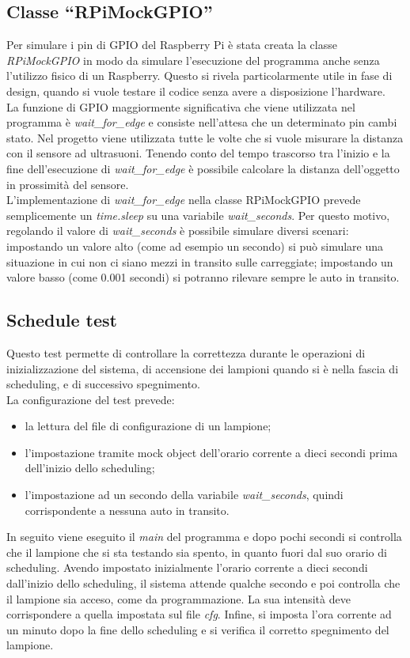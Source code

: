 \subsection{Classe ``RPiMockGPIO''}
Per simulare i pin di GPIO del Raspberry Pi è stata creata la classe \textit{RPiMockGPIO} in modo da simulare l'esecuzione del programma anche senza l'utilizzo fisico di un Raspberry.
Questo si rivela particolarmente utile in fase di design, quando si vuole testare il codice senza avere a disposizione l'hardware.
\\La funzione di GPIO maggiormente significativa che viene utilizzata nel programma è \textit{wait\_for\_edge} e consiste nell'attesa che un determinato pin cambi stato.
Nel progetto viene utilizzata tutte le volte che si vuole misurare la distanza con il sensore ad ultrasuoni.
Tenendo conto del tempo trascorso tra l'inizio e la fine dell'esecuzione di \textit{wait\_for\_edge} è possibile calcolare la distanza dell'oggetto in prossimità del sensore.
\\L'implementazione di \textit{wait\_for\_edge} nella classe RPiMockGPIO prevede semplicemente un \textit{time.sleep} su una variabile \textit{wait\_seconds}.
Per questo motivo, regolando il valore di \textit{wait\_seconds} è possibile simulare diversi scenari: impostando un valore alto (come ad esempio un secondo) si può simulare una situazione in cui non ci siano mezzi in transito sulle carreggiate;
impostando un valore basso (come 0.001 secondi) si potranno rilevare sempre le auto in transito.

\subsection{Schedule test \label{st}}
Questo test permette di controllare la correttezza durante le operazioni di inizializzazione del sistema, di accensione dei lampioni quando si è nella fascia di scheduling, e di successivo spegnimento.
\\La configurazione del test prevede:
\begin{itemize}
	\item la lettura del file di configurazione di un lampione;
	\item l'impostazione tramite mock object dell'orario corrente a dieci secondi prima dell'inizio dello scheduling;
	\item l'impostazione ad un secondo della variabile \textit{wait\_seconds}, quindi corrispondente a nessuna auto in transito.
\end{itemize}
In seguito viene eseguito il \textit{main} del programma e dopo pochi secondi si controlla che il lampione che si sta testando sia spento, in quanto fuori dal suo orario di scheduling.
Avendo impostato inizialmente l'orario corrente a dieci secondi dall'inizio dello scheduling, il sistema attende qualche secondo e poi controlla che il lampione sia acceso, come da programmazione.
La sua intensità deve corrispondere a quella impostata sul file \textit{cfg}.
Infine, si imposta l'ora corrente ad un minuto dopo la fine dello scheduling e si verifica il corretto spegnimento del lampione.

